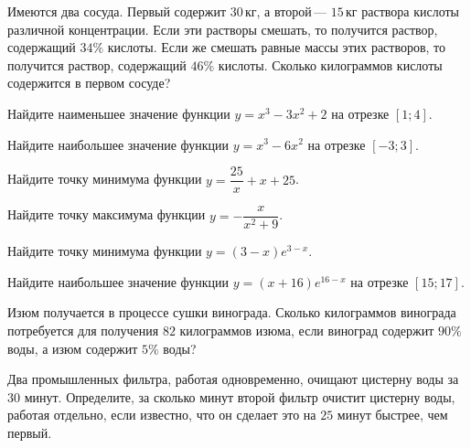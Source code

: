 \begin{class}[number=2]
\begin{listofex}
		
		\item Имеются два сосуда. Первый содержит \(30\) кг, а второй --- \(15\) кг раствора кислоты различной концентрации. Если эти растворы смешать, то получится раствор, содержащий \(34\%\) кислоты. Если же смешать равные массы этих растворов, то получится раствор, содержащий \(46\%\) кислоты. Сколько килограммов кислоты содержится в первом сосуде?
	\end{listofex}
\end{class}

\begin{homework}[number=1]
	\begin{listofex}
		\item Найдите наименьшее значение функции \(y=x^3-3x^2+2\) на отрезке \([1;4]\).
		\item Найдите наибольшее значение функции \(y=x^3-6x^2\) на отрезке \([-3;3]\).
		\item Найдите точку минимума функции \(y=\dfrac{ 25 }{ x }+x+25\).
		\item Найдите точку максимума функции \(y=-\dfrac{ x }{ x^2+9 }\).
		\item Найдите точку минимума функции \(y=(3-x)e^{3-x}\).
		\item Найдите наибольшее значение функции \(y=(x+16)e^{16-x}\) на отрезке \([15;17]\).
		\item Изюм получается в процессе сушки винограда. Сколько килограммов винограда потребуется для получения \(82\) килограммов изюма, если виноград содержит \(90\%\) воды, а изюм содержит \(5\%\) воды?
		\item Два промышленных фильтра, работая одновременно, очищают цистерну воды за \(30\) минут. Определите, за сколько минут второй фильтр очистит цистерну воды, работая отдельно, если известно, что он сделает это на \(25\) минут быстрее, чем первый.
	\end{listofex}
\end{homework}

